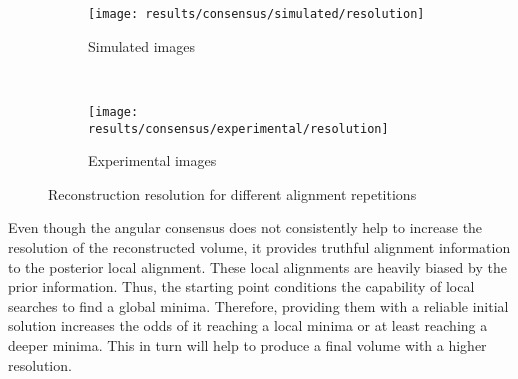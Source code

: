 \documentclass[../main.tex]{subfiles}
\begin{document}
\begin{figure}[htbp]
    \centering
    \begin{subfigure}[b]{.8\textwidth}
         \centering
         \texttt{[image: results/consensus/simulated/resolution]}
         \caption{Simulated images}
    \end{subfigure}\\
    \vspace{2em}
    \begin{subfigure}[b]{.8\textwidth}
         \centering
         \texttt{[image: results/consensus/experimental/resolution]}
         \caption{Experimental images}
    \end{subfigure}
    \caption{Reconstruction resolution for different alignment repetitions}
    \label{fig:5:consensus_resolution}
\end{figure}

Even though the angular consensus does not consistently help to increase the resolution of the reconstructed volume, it provides truthful alignment information to the posterior local alignment. These local alignments are heavily biased by the prior information. Thus, the starting point conditions the capability of local searches to find a global minima. Therefore, providing them with a reliable initial solution increases the odds of it reaching a local minima or at least reaching a deeper minima. This in turn will help to produce a final volume with a higher resolution.
\end{document}
